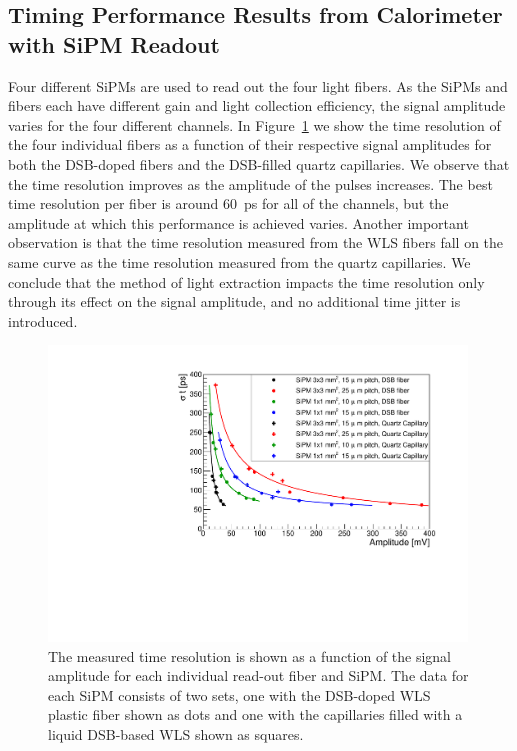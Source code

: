 \subsection{Timing Performance Results from Calorimeter with SiPM Readout}
\label{sec:beamtiming}

Four different SiPMs are used to read out the four light fibers. As the SiPMs
and fibers each have different gain and light collection efficiency, the signal
amplitude varies for the four different channels. In Figure~\ref{TimeResolution}
we show the time resolution of the four individual fibers as a function of their
respective signal amplitudes for both the DSB-doped fibers and the DSB-filled
quartz capillaries. We observe that the time resolution improves as the
amplitude of the pulses increases. The best time resolution per fiber is around
$60$~ps for all of the channels, but the amplitude at which this performance is
achieved varies. Another important observation is that the time resolution
measured from the WLS fibers fall on the same curve as the time
resolution measured from the quartz capillaries. We conclude that the method of
light extraction impacts the time resolution only through its effect on the
signal amplitude, and no additional time jitter is introduced. 


\begin{figure}[!htb]
\centering
\includegraphics[width=0.99\textwidth]{figures/ShashlikTimeResolution.pdf}
\caption{\label{TimeResolution} The measured time resolution is shown as a
function of the signal amplitude for each individual read-out fiber and SiPM.
The data for each SiPM consists of two sets, one with the DSB-doped WLS plastic fiber
shown as dots and one with the capillaries filled with a liquid DSB-based WLS shown as
squares. }
\end{figure}



